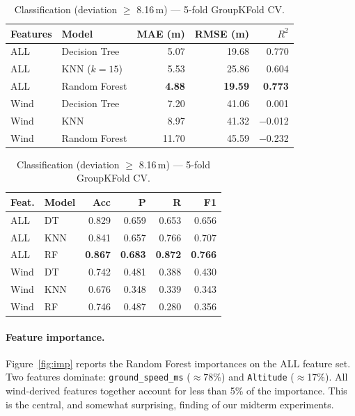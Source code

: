 \documentclass[10pt]{article}
\begin{document}
\begin{table}[h]
\small
\centering
\begin{minipage}[t]{0.48\linewidth}
\centering
\caption{Regression — 5-fold GroupKFold CV.}
\label{tab:reg}
\begin{tabular}{llrrr}
\toprule
Features & Model & MAE (m) & RMSE (m) & $R^2$ \\
\midrule
ALL  & Decision Tree   & 5.07 & 19.68 & 0.770 \\
ALL  & KNN ($k\!=\!15$) & 5.53 & 25.86 & 0.604 \\
ALL  & Random Forest   & \textbf{4.88} & \textbf{19.59} & \textbf{0.773} \\
\midrule
Wind & Decision Tree   & 7.20 & 41.06 & \phantom{$-$}0.001 \\
Wind & KNN             & 8.97 & 41.32 & $-$0.012 \\
Wind & Random Forest   & 11.70 & 45.59 & $-$0.232 \\
\bottomrule
\end{tabular}
\end{minipage}\hfill
\begin{minipage}[t]{0.48\linewidth}
\centering
\caption{Classification (deviation $\ge$ 8.16\,m) — 5-fold GroupKFold CV.}
\label{tab:cls}
\begin{tabular}{llrrrr}
\toprule
Feat. & Model & Acc & P & R & F1 \\
\midrule
ALL  & DT  & 0.829 & 0.659 & 0.653 & 0.656 \\
ALL  & KNN & 0.841 & 0.657 & 0.766 & 0.707 \\
ALL  & RF  & \textbf{0.867} & \textbf{0.683} & \textbf{0.872} & \textbf{0.766} \\
\midrule
Wind & DT  & 0.742 & 0.481 & 0.388 & 0.430 \\
Wind & KNN & 0.676 & 0.348 & 0.339 & 0.343 \\
Wind & RF  & 0.746 & 0.487 & 0.280 & 0.356 \\
\bottomrule
\end{tabular}
\end{minipage}
\end{table}

\paragraph{Feature importance.} Figure~\ref{fig:imp} reports the Random Forest importances on the ALL feature set. Two features dominate: \texttt{ground\_speed\_ms} ($\approx$78\%) and \texttt{Altitude} ($\approx$17\%). All wind-derived features together account for less than 5\% of the importance. This is the central, and somewhat surprising, finding of our midterm experiments.
\end{document}
